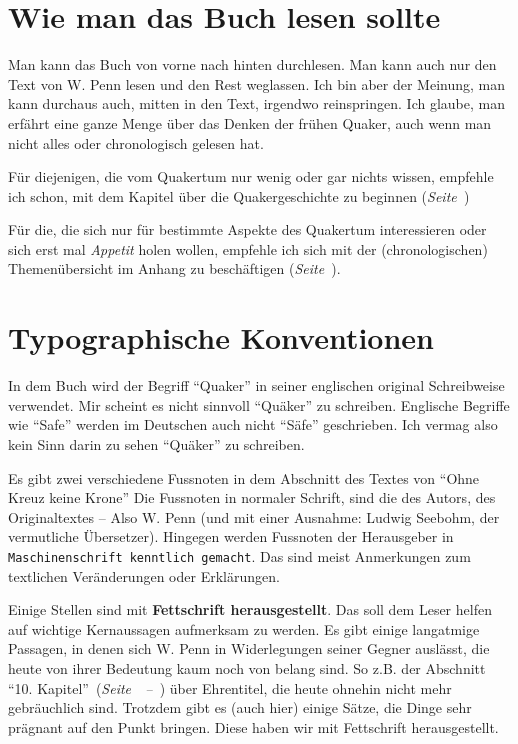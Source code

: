 \chapter{Wie man das Buch lesen sollte}

Man kann das Buch von vorne nach hinten durchlesen. Man kann auch nur den Text
von W. Penn lesen und den Rest weglassen. Ich bin aber der Meinung, man kann
durchaus auch, mitten in den Text, irgendwo reinspringen. Ich glaube, man
erfährt eine ganze Menge über das Denken der frühen Quaker, auch wenn man nicht
alles oder chronologisch gelesen hat.

\medskip

Für diejenigen, die vom Quakertum nur wenig oder gar nichts wissen, empfehle ich
 schon, mit dem Kapitel über die Quakergeschichte zu beginnen
 (\textit{Seite~\pageref{ref:entwicklung_quakertum}})

\medskip

Für die, die sich nur für bestimmte Aspekte des Quakertum interessieren oder
sich erst mal \textit{Appetit} holen wollen, empfehle ich sich mit der
(chronologischen) Themenübersicht im Anhang zu beschäftigen
(\textit{Seite~\pageref{ref:theme_nuebersicht}}).

\chapter{Typographische Konventionen}

In dem Buch wird der Begriff "`Quaker"'  in seiner
englischen original Schreibweise verwendet. Mir scheint es nicht sinnvoll
"`Quäker"' zu schreiben. Englische Begriffe wie "`Safe"' werden im Deutschen
auch nicht "`Säfe"' geschrieben. Ich vermag also kein Sinn darin zu sehen
"`Quäker"' zu schreiben.

\medskip

Es gibt zwei verschiedene Fussnoten in dem Abschnitt des Textes von "`Ohne Kreuz
keine Krone"' Die Fussnoten in normaler Schrift, sind die des Autors, des
Originaltextes -- Also W. Penn (und mit einer Ausnahme: Ludwig Seebohm, der vermutliche Übersetzer). Hingegen werden Fussnoten der Herausgeber in
\texttt{Maschinenschrift kenntlich gemacht}. Das sind meist Anmerkungen zum
textlichen Veränderungen oder Erklärungen.

\medskip

Einige Stellen sind mit \textbf{Fettschrift herausgestellt}. Das soll dem Leser
helfen auf wichtige Kernaussagen aufmerksam zu werden. Es gibt einige langatmige
Passagen, in denen sich W. Penn in Widerlegungen seiner Gegner auslässt, die
heute von ihrer Bedeutung kaum noch von belang sind. So z.B. der Abschnitt
"`10. Kapitel"'~(\textit{Seite~\pageref{kap10}~--~\pageref{kap10_ende}}) über
Ehrentitel, die heute ohnehin nicht mehr gebräuchlich sind. Trotzdem gibt es
(auch hier) einige Sätze, die Dinge sehr prägnant auf den Punkt bringen.
Diese haben wir mit Fettschrift herausgestellt.


